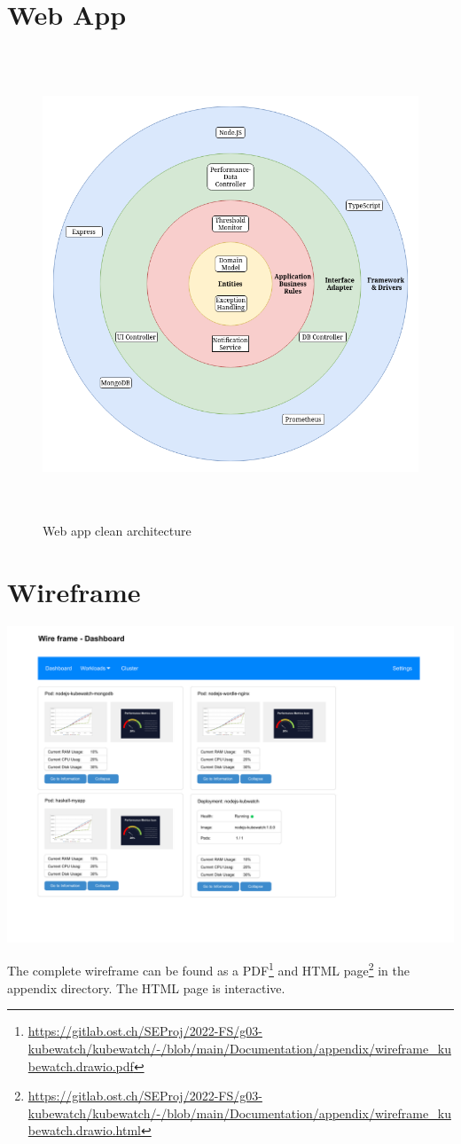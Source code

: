 \section{Web App}
\begin{figure}[H]
  \centering
  \includegraphics[height=14cm]{resources/clean_architecture.png}
  \caption{Web app clean architecture}
  \label{fig:web-app-architecture}
\end{figure}

\section{Wireframe}
\includegraphics[width=15cm]{../appendix/wireframe_kubewatch.drawio.pdf}


The complete wireframe can be found as a PDF\footnote{\url{https://gitlab.ost.ch/SEProj/2022-FS/g03-kubewatch/kubewatch/-/blob/main/Documentation/appendix/wireframe_kubewatch.drawio.pdf}} and HTML page\footnote{\url{https://gitlab.ost.ch/SEProj/2022-FS/g03-kubewatch/kubewatch/-/blob/main/Documentation/appendix/wireframe_kubewatch.drawio.html}} in the appendix directory.
The HTML page is interactive.
